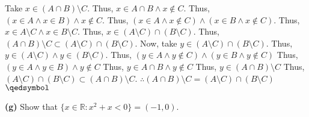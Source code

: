 \documentclass[12pt]{article}
\newcommand{\R}{\mathbb{R}}
\begin{document}
\begin{solution}
\newline Take $x\in (A\cap B)\setminus C$.\newline
Thus, $x\in A\cap B\land x\notin C$.\newline
Thus, $(x\in A \land x\in B) \land x\notin C$.\newline
Thus, $(x\in A \land x\notin C)\land(x\in B\land x\notin C)$.\newline
Thus, $x\in A\setminus C\land x\in B\setminus C$.\newline
Thus, $x\in (A\setminus C)\cap (B\setminus C)$.\newline
Thus, $(A\cap B)\setminus C \subset (A\setminus C)\cap (B\setminus C)$.\newline\newline
Now, take $y\in (A\setminus C)\cap (B\setminus C)$.\newline
Thus, $y\in(A\setminus C)\land y\in (B\setminus C)$.\newline
Thus, $(y\in A \land y\notin C)\land (y\in B \land y\notin C)$\newline
Thus, $(y\in A \land y\in B)\land y\notin C$\newline
Thus, $y\in A\cap B \land y\notin C$\newline
Thus, $y\in (A\cap B)\setminus C$\newline
Thus, $(A\setminus C)\cap (B\setminus C)\subset (A\cap B)\setminus C$.\newline
$\therefore(A\cap B)\setminus C = (A\setminus C)\cap (B\setminus C)$\flushright$\qedsymbol$
\end{solution}
\begin{subproblem}\textbf{(g)}
Show that $\{x \in \R : x^2 + x < 0\} = (-1,0)$.
\end{subproblem}
\end{document}
